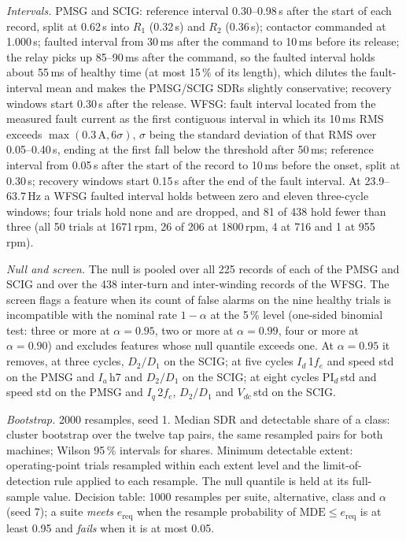 \begin{appendices}
\emph{Intervals.} PMSG and SCIG: reference interval 0.30--0.98\,s after the start of each record, split at 0.62\,s into $R_1$ (0.32\,s) and $R_2$ (0.36\,s); contactor commanded at 1.000\,s; faulted interval from 30\,ms after the command to 10\,ms before its release; the relay picks up 85--90\,ms after the command, so the faulted interval holds about 55\,ms of healthy time (at most 15\,\% of its length), which dilutes the fault-interval mean and makes the PMSG/SCIG SDRs slightly conservative; recovery windows start 0.30\,s after the release. WFSG: fault interval located from the measured fault current as the first contiguous interval in which its 10\,ms RMS exceeds $\max(0.3\,\mathrm{A}, 6\sigma)$, $\sigma$ being the standard deviation of that RMS over 0.05--0.40\,s, ending at the first fall below the threshold after 50\,ms; reference interval from 0.05\,s after the start of the record to 10\,ms before the onset, split at 0.30\,s; recovery windows start 0.15\,s after the end of the fault interval. At 23.9--63.7\,Hz a WFSG faulted interval holds between zero and eleven three-cycle windows; four trials hold none and are dropped, and 81 of 438 hold fewer than three (all 50 trials at 1671\,rpm, 26 of 206 at 1800\,rpm, 4 at 716 and 1 at 955\,rpm).

\emph{Null and screen.} The null is pooled over all 225 records of each of the PMSG and SCIG and over the 438 inter-turn and inter-winding records of the WFSG. The screen flags a feature when its count of false alarms on the nine healthy trials is incompatible with the nominal rate $1-\alpha$ at the 5\,\% level (one-sided binomial test: three or more at $\alpha=0.95$, two or more at $\alpha=0.99$, four or more at $\alpha=0.90$) and excludes features whose null quantile exceeds one. At $\alpha=0.95$ it removes, at three cycles, $D_2/D_1$ on the SCIG; at five cycles $I_d$\,1$f_e$ and speed std on the PMSG and $I_a$\,h7 and $D_2/D_1$ on the SCIG; at eight cycles PI$_d$\,std and speed std on the PMSG and $I_q$\,2$f_e$, $D_2/D_1$ and $V_{dc}$\,std on the SCIG.

\emph{Bootstrap.} 2000 resamples, seed 1. Median SDR and detectable share of a class: cluster bootstrap over the twelve tap pairs, the same resampled pairs for both machines; Wilson 95\,\% intervals for shares. Minimum detectable extent: operating-point trials resampled within each extent level and the limit-of-detection rule applied to each resample. The null quantile is held at its full-sample value. Decision table: 1000 resamples per suite, alternative, class and $\alpha$ (seed 7); a suite \emph{meets} $e_{\mathrm{req}}$ when the resample probability of $\mathrm{MDE}\le e_{\mathrm{req}}$ is at least 0.95 and \emph{fails} when it is at most 0.05.


\end{appendices}
